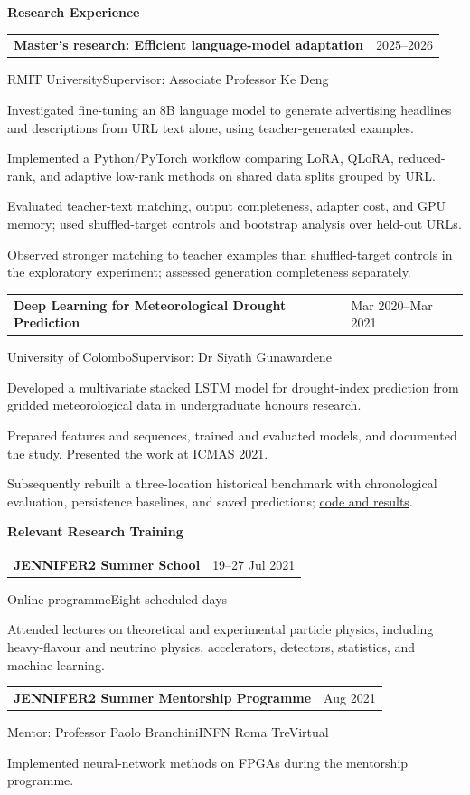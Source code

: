 \documentclass[10pt,a4paper]{article}
\makeatletter
\newcommand{\contactsep}{\hspace{0.55em}\textcolor{hairline}{\textbullet}\hspace{0.55em}}
\newcommand{\cvsection}[1]{%
  \par\vspace{0.78em}%
  {\sffamily\bfseries\color{accent}\fontsize{11.3}{13.2}\selectfont #1}\par
  \vspace{0.3em}}
\newcommand{\cventry}[3]{%
  \par\noindent
  \begin{tabularx}{\textwidth}{@{}>{\raggedright\arraybackslash}X
    >{\raggedleft\arraybackslash\sffamily\leavevmode\color{accent}}p{3.25cm}@{}}
    \textbf{#1} & {\small #2}
  \end{tabularx}\par\vspace{-0.08em}%
  {\small\sffamily\color{muted}#3}\par\vspace{0.12em}}
\newenvironment{cvitems}{%
  \begin{list}{\textcolor{accent}{\raisebox{0.15ex}{\scriptsize\textbullet}}}{%
    \setlength{\leftmargin}{1.18em}\setlength{\labelsep}{0.42em}%
    \setlength{\itemsep}{1.4pt}\setlength{\topsep}{2.2pt}%
    \setlength{\parsep}{0pt}\setlength{\partopsep}{0pt}}%
}{\end{list}}
\makeatother
\begin{document}
\cvsection{Research Experience}
\cventry{Master's research: Efficient language-model adaptation}{2025--2026}
  {RMIT University\contactsep Supervisor: Associate Professor Ke Deng}
\begin{cvitems}
  \item Investigated fine-tuning an 8B language model to generate advertising
  headlines and descriptions from URL text alone, using teacher-generated examples.
  \item Implemented a Python/PyTorch workflow comparing LoRA, QLoRA, reduced-rank,
  and adaptive low-rank methods on shared data splits grouped by URL.
  \item Evaluated teacher-text matching, output completeness, adapter cost, and GPU
  memory; used shuffled-target controls and bootstrap analysis over held-out URLs.
  \item Observed stronger matching to teacher examples than shuffled-target controls
  in the exploratory experiment; assessed generation completeness separately.
\end{cvitems}


\cventry{Deep Learning for Meteorological Drought Prediction}{Mar 2020--Mar 2021}
  {University of Colombo\contactsep Supervisor: Dr Siyath Gunawardene}
\begin{cvitems}
  \item Developed a multivariate stacked LSTM model for drought-index prediction
  from gridded meteorological data in undergraduate honours research.
  \item Prepared features and sequences, trained and evaluated models, and documented
  the study. Presented the work at ICMAS 2021.
  \item Subsequently rebuilt a three-location historical benchmark with chronological
  evaluation, persistence baselines, and saved predictions;
  \href{https://github.com/erankawinda/spei-drought-prediction}{code and results}.
\end{cvitems}

\cvsection{Relevant Research Training}
\cventry{JENNIFER2 Summer School}{19--27 Jul 2021}
  {Online programme\contactsep Eight scheduled days}
\begin{cvitems}
  \item Attended lectures on theoretical and experimental particle physics, including
  heavy-flavour and neutrino physics, accelerators, detectors, statistics, and
  machine learning.
\end{cvitems}
\cventry{JENNIFER2 Summer Mentorship Programme}{Aug 2021}
  {Mentor: Professor Paolo Branchini\contactsep INFN Roma Tre\contactsep Virtual}
\begin{cvitems}
  \item Implemented neural-network methods on FPGAs during the mentorship programme.
\end{cvitems}
\end{document}
